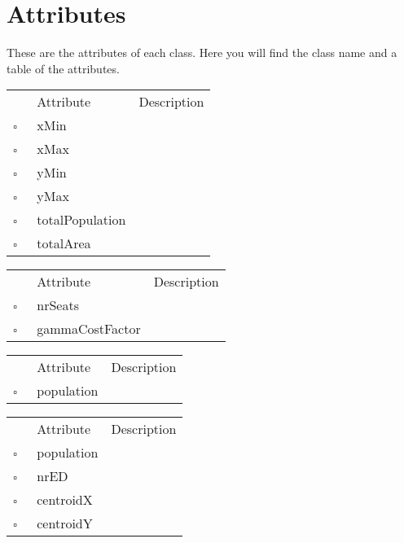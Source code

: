 \chapter{Attributes}
These are the attributes of each class. Here you will find the class name and a table of the attributes.     
\begin{table}
\caption{Area  }

\begin{longtable}{llp{8cm}}
& Attribute & Description \\
$\square$\ & xMin &  \\
$\square$\ & xMax &  \\
$\square$\ & yMin &  \\
$\square$\ & yMax &  \\
$\square$\ & totalPopulation &  \\
$\square$\ & totalArea &  \\
\end{longtable}
\label{attr:Area}
\end{table}

\clearpage
\begin{table}
\caption{ConstituencyType  }

\begin{longtable}{llp{8cm}}
& Attribute & Description \\
$\square$\ & nrSeats &  \\
$\square$\ & gammaCostFactor &  \\
\end{longtable}
\label{attr:ConstituencyType}
\end{table}

\begin{table}
\caption{Country  }

\begin{longtable}{llp{8cm}}
& Attribute & Description \\
$\square$\ & population &  \\
\end{longtable}
\label{attr:Country}
\end{table}

\begin{table}
\caption{County  }

\begin{longtable}{llp{8cm}}
& Attribute & Description \\
$\square$\ & population &  \\
$\square$\ & nrED &  \\
$\square$\ & centroidX &  \\
$\square$\ & centroidY &  \\
\end{longtable}
\label{attr:County}
\end{table}

